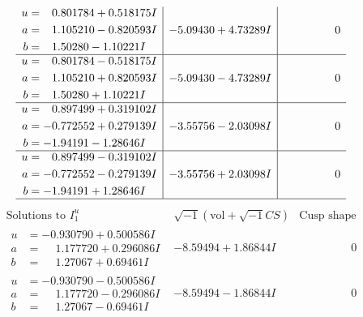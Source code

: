\documentclass[1p]{elsarticle_modified}
\theoremstyle{definition}
\newcommand{\I}{\sqrt{-1}}
\begin{document}
$$\begin{array}{c|c|c}
\begin{aligned}
u &= \phantom{-}0.801784 + 0.518175 I \\
a &= \phantom{-}1.105210 - 0.820593 I \\
b &= \phantom{-}1.50280 - 1.10221 I\end{aligned}
 & -5.09430 + 4.73289 I & \phantom{-0.000000 } 0 \\ \hline\begin{aligned}
u &= \phantom{-}0.801784 - 0.518175 I \\
a &= \phantom{-}1.105210 + 0.820593 I \\
b &= \phantom{-}1.50280 + 1.10221 I\end{aligned}
 & -5.09430 - 4.73289 I & \phantom{-0.000000 } 0 \\ \hline\begin{aligned}
u &= \phantom{-}0.897499 + 0.319102 I \\
a &= -0.772552 + 0.279139 I \\
b &= -1.94191 - 1.28646 I\end{aligned}
 & -3.55756 - 2.03098 I & \phantom{-0.000000 } 0 \\ \hline\begin{aligned}
u &= \phantom{-}0.897499 - 0.319102 I \\
a &= -0.772552 - 0.279139 I \\
b &= -1.94191 + 1.28646 I\end{aligned}
 & -3.55756 + 2.03098 I & \phantom{-0.000000 } 0\\
 \hline 
 \end{array}$$\newpage$$\begin{array}{c|c|c}  
\text{Solutions to }I^u_{1}& \I (\text{vol} + \sqrt{-1}CS) & \text{Cusp shape}\\
 \hline 
\begin{aligned}
u &= -0.930790 + 0.500586 I \\
a &= \phantom{-}1.177720 + 0.296086 I \\
b &= \phantom{-}1.27067 + 0.69461 I\end{aligned}
 & -8.59494 + 1.86844 I & \phantom{-0.000000 } 0 \\ \hline\begin{aligned}
u &= -0.930790 - 0.500586 I \\
a &= \phantom{-}1.177720 - 0.296086 I \\
b &= \phantom{-}1.27067 - 0.69461 I\end{aligned}
 & -8.59494 - 1.86844 I & \phantom{-0.000000 } 0 \\ \hline\begin{aligned}

\end{aligned}
\end{array}$$
\end{document}
